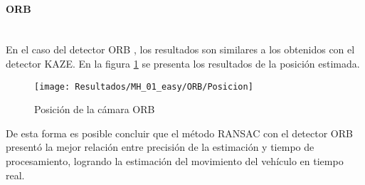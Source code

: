 \paragraph {ORB \\ \\}

En el caso del detector ORB , los resultados son similares a los obtenidos con el detector KAZE. En la figura \ref{imagen:Resultados/MH_01_easy/ORB/Posicion} se presenta los resultados de la posición estimada.
	
\begin{figure}[H]
	\centering
	\texttt{[image: Resultados/MH\_01\_easy/ORB/Posicion]}
	\caption{Posición de la cámara ORB}
	\label{imagen:Resultados/MH_01_easy/ORB/Posicion}
\end{figure}

De esta forma es posible concluir que el método RANSAC con el detector ORB presentó la mejor relación entre precisión de la estimación y tiempo de procesamiento, logrando la estimación del movimiento del vehículo en tiempo real.



